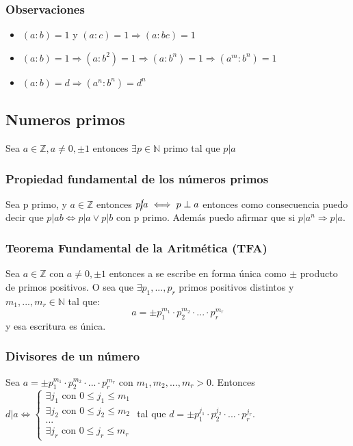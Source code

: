 \documentclass{article}
\begin{document}
\subsubsection{Observaciones}
\begin{itemize}
    \item $(a:b) = 1$ y $(a:c) = 1 \Rightarrow (a:bc) = 1$
    \item $(a:b) = 1 \Rightarrow (a:b^2) = 1 \Rightarrow (a:b^n) = 1 \Rightarrow (a^m: b^n) = 1$
    \item $(a:b) = d \Rightarrow (a^n: b^n) = d^n$
\end{itemize}
\subsection{Numeros primos}
Sea $a \in \mathbb{Z}, a\neq 0,\pm 1$ entonces $\exists p \in \mathbb{N}$ primo tal que $p|a$
\subsubsection{Propiedad fundamental de los números primos}
Sea p primo, y $a \in \mathbb{Z}$ entonces $p \cancel{|}a \iff p \perp a$ entonces como consecuencia puedo decir que $p | ab \iff p|a \lor p|b$ con p primo. Además puedo afirmar que si $p|a^n \Rightarrow p|a$.
\subsubsection{Teorema Fundamental de la Aritmética (TFA)}
Sea $a \in \mathbb{Z}$ con $a \neq 0, \pm 1$ entonces a se escribe en forma única como $\pm$ producto de primos positivos. O sea que $\exists p_1,...,p_r$ primos positivos distintos y $m_1,...,m_r \in \mathbb{N}$ tal que: \begin{equation}
    a  = \pm p_1^{m_1} \cdot p_2^{m_2} \cdot ... \cdot p_r^{m_r}
\end{equation}
y esa escritura es única.
\subsubsection{Divisores de un número}
Sea $a = \pm p_1^{m_1} \cdot p_2^{m_2} \cdot ... \cdot p_r^{m_r}$ con $m_1,m_2,...,m_r > 0$. Entonces \begin{math}
    d|a \iff \begin{cases}
\exists j_1 \text{ con } 0 \leq j_1 \leq m_1 \\
\exists j_2 \text{ con } 0 \leq j_2 \leq m_2 \\
... \\
\exists j_r \text{ con } 0 \leq j_r \leq m_r
\end{cases}
\end{math}
tal que $d = \pm p_1^{j_1} \cdot p_2^{j_2} \cdot ... \cdot p_r^{j_r}$.
\end{document}
